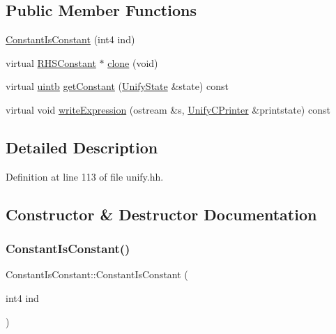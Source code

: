 \subsection*{Public Member Functions}
\begin{DoxyCompactItemize}
\item 
\mbox{\hyperlink{class_constant_is_constant_a1c9f0597dadddda355d25861841a166b}{Constant\+Is\+Constant}} (int4 ind)
\item 
virtual \mbox{\hyperlink{class_r_h_s_constant}{R\+H\+S\+Constant}} $\ast$ \mbox{\hyperlink{class_constant_is_constant_ac66be1ba7e938346231c0e206f5f8a65}{clone}} (void)
\item 
virtual \mbox{\hyperlink{types_8h_a2db313c5d32a12b01d26ac9b3bca178f}{uintb}} \mbox{\hyperlink{class_constant_is_constant_a026e1257509c60e833d289486edae6f0}{get\+Constant}} (\mbox{\hyperlink{class_unify_state}{Unify\+State}} \&state) const
\item 
virtual void \mbox{\hyperlink{class_constant_is_constant_ac547445e4235052567994b48c632202f}{write\+Expression}} (ostream \&s, \mbox{\hyperlink{class_unify_c_printer}{Unify\+C\+Printer}} \&printstate) const
\end{DoxyCompactItemize}


\subsection{Detailed Description}


Definition at line 113 of file unify.\+hh.



\subsection{Constructor \& Destructor Documentation}
\mbox{\label{class_constant_is_constant_a1c9f0597dadddda355d25861841a166b}} 
\subsubsection{\texorpdfstring{ConstantIsConstant()}{ConstantIsConstant()}}
{\footnotesize\ttfamily Constant\+Is\+Constant\+::\+Constant\+Is\+Constant (\begin{DoxyParamCaption}\item[{int4}]{ind }\end{DoxyParamCaption})\hspace{0.3cm}{\ttfamily [inline]}}



